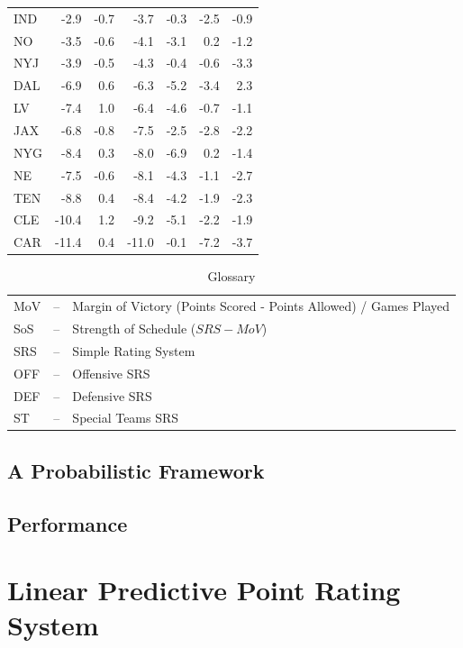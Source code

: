 \documentclass{report}
\begin{document}
\begin{table}[ht]
\begin{tabular}{ | l | r r r r r r | }
        IND & -2.9 & -0.7 & -3.7 & -0.3 & -2.5 & -0.9 \\
        NO & -3.5 & -0.6 & -4.1 & -3.1 & 0.2 & -1.2 \\
        NYJ & -3.9 & -0.5 & -4.3 & -0.4 & -0.6 & -3.3 \\
        DAL & -6.9 & 0.6 & -6.3 & -5.2 & -3.4 & 2.3 \\
        LV & -7.4 & 1.0 & -6.4 & -4.6 & -0.7 & -1.1 \\
        JAX & -6.8 & -0.8 & -7.5 & -2.5 & -2.8 & -2.2 \\
        NYG & -8.4 & 0.3 & -8.0 & -6.9 & 0.2 & -1.4 \\
        NE & -7.5 & -0.6 & -8.1 & -4.3 & -1.1 & -2.7 \\
        TEN & -8.8 & 0.4 & -8.4 & -4.2 & -1.9 & -2.3 \\
        CLE & -10.4 & 1.2 & -9.2 & -5.1 & -2.2 & -1.9 \\
        CAR & -11.4 & 0.4 & -11.0 & -0.1 & -7.2 & -3.7 \\
        \hline
        \hline
    \end{tabular}
\end{table}

\begin{table}[ht]
    \centering
    \caption*{Glossary}
    \begin{tabular}{l c l}
        \hline
        MoV & -- & Margin of Victory (Points Scored - Points Allowed) / Games Played\\
        SoS & -- & Strength of Schedule ($SRS - MoV$) \\
        SRS & -- & Simple Rating System \\
        OFF & -- & Offensive SRS \\
        DEF & -- & Defensive SRS \\
        ST & -- & Special Teams SRS \\
        \hline
    \end{tabular}
\end{table}

\section{A Probabilistic Framework}

\section{Performance}

\chapter{Linear Predictive Point Rating System}
\end{document}
